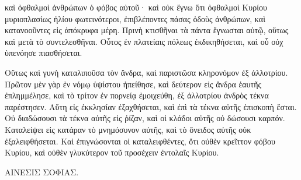 {καὶ ὀφθαλμοὶ ἀνθρώπων ὁ φόβος αὐτοῦ· καὶ οὐκ ἔγνω ὅτι ὀφθαλμοὶ Κυρίου μυριοπλασίως ἡλίου φωτεινότεροι, ἐπιβλέποντες πάσας ὁδοὺς ἀνθρώπων, καὶ κατανοοῦντες εἰς ἀπόκρυφα μέρη.
Πρινὴ κτισθῆναι τὰ πάντα ἔγνωσται αὐτῷ, οὕτως καὶ μετὰ τὸ συντελεσθῆναι.
Οὗτος ἐν πλατείαις πόλεως ἐκδικηθήσεται, καὶ οὗ οὐχ ὑπενόησε πιασθήσεται.
\par }{\PP {}Οὕτως καὶ γυνὴ καταλιποῦσα τὸν ἄνδρα, καὶ παριστῶσα κληρονόμον ἐξ ἀλλοτρίου.
Πρῶτον μὲν γὰρ ἐν νόμῳ ὑψίστου ἠπείθησε, καὶ δεύτερον εἰς ἄνδρα ἑαυτῆς ἐπλημμέλησε, καὶ τὸ τρίτον ἐν πορνείᾳ ἐμοιχεύθη, ἐξ ἀλλοτρίου ἀνδρὸς τέκνα παρέστησεν.
Αὕτη εἰς ἐκκλησίαν ἐξαχθήσεται, καὶ ἐπὶ τὰ τέκνα αὐτῆς ἐπισκοπὴ ἔσται.
Οὐ διαδώσουσι τὰ τέκνα αὐτῆς εἰς ῥίζαν, καὶ οἱ κλάδοι αὐτῆς οὐ δώσουσι καρπόν.
Καταλείψει εἰς κατάραν τὸ μνημόσυνον αὐτῆς, καὶ τὸ ὄνειδος αὐτῆς οὐκ ἐξαλειφθήσεται.
Καὶ ἐπιγνώσονται οἱ καταλειφθέντες, ὅτι οὐθὲν κρεῖττον φόβου Κυρίου, καὶ οὐθὲν γλυκύτερον τοῦ προσέχειν ἐντολαῖς Κυρίου.
\par }{\PP ΑΙΝΕΣΙΣ ΣΟΦΙΑΣ.

}
